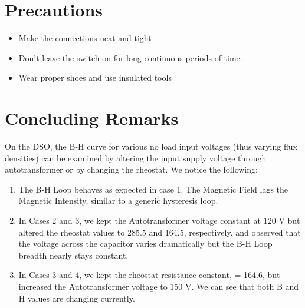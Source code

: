 \documentclass{article}
\begin{document}
\section{Precautions}

\begin{itemize}
\item Make the connections neat and tight
\item Don’t leave the switch on for long continuous periods of time.
\item Wear proper shoes and use insulated tools
\end{itemize}

\section{Concluding Remarks}
On the DSO, the B-H curve for various no load input voltages (thus varying flux densities) can be examined by altering the input supply voltage through autotransformer or by changing the rheostat. We notice the following:
\begin{enumerate}
    \item The B-H Loop behaves as expected in case 1. The Magnetic Field lags the Magnetic Intensity, similar to a generic hysteresis loop.
    \item In Cases 2 and 3, we kept the Autotransformer voltage constant at 120 V but altered the rheostat values to 285.5 and 164.5, respectively, and observed that the voltage across the capacitor varies dramatically but the B-H Loop breadth nearly stays constant.
    \item In Cases 3 and 4, we kept the rheostat resistance constant, = 164.6, but increased the Autotransformer voltage to 150 V. We can see that both B and H values are changing currently.
\end{enumerate}
\end{document}
